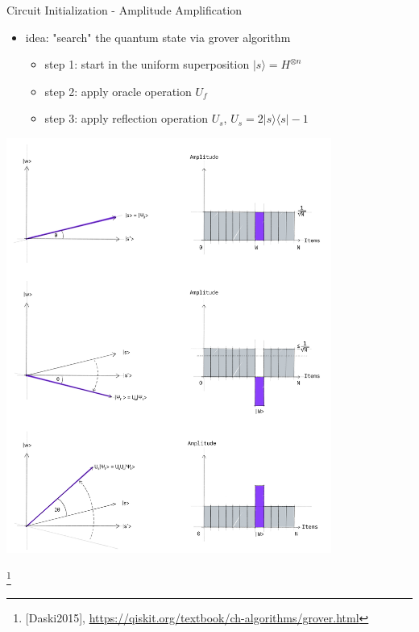 \begin{frame}{Circuit Initialization - Amplitude Amplification}
  \begin{minipage}{0.5\textwidth}
    \begin{itemize}
      \item idea: "search" the quantum state via grover algorithm
      \begin{itemize}
        \item step 1: start in the uniform superposition $|s\rangle = H^{\otimes n}$
        \item step 2: apply oracle operation $U_f$
        \item step 3: apply reflection operation $U_s$, $U_s=2|s\rangle \langle s| -1$
      \end{itemize}
    \end{itemize}
  \end{minipage}%
  \hfill
  \begin{minipage}{0.5\textwidth}
    \centering
    \includegraphics[width=0.8\textwidth]{../assets/grover_steps.png}
  \end{minipage}
  \footnote{[Daski2015], \url{https://qiskit.org/textbook/ch-algorithms/grover.html}}
\end{frame}


